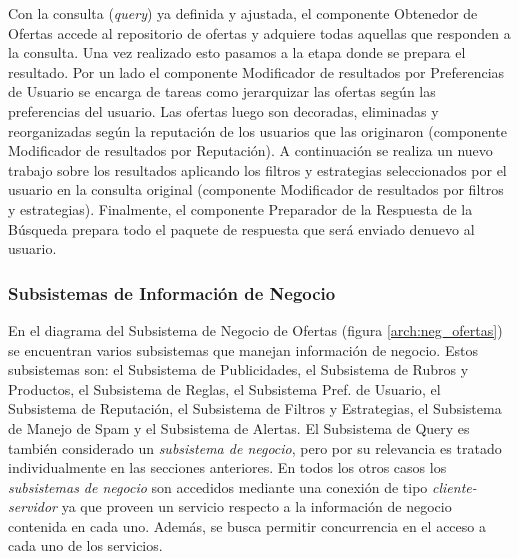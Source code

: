 Con la consulta (\emph{query}) ya definida y ajustada, el componente \textsf{Obtenedor de Ofertas} accede al repositorio de ofertas y adquiere todas aquellas que responden a la consulta.  Una vez realizado esto pasamos a la etapa donde se prepara el resultado. Por un lado el componente \textsf{Modificador de resultados por Preferencias de Usuario} se encarga de tareas como jerarquizar las ofertas según las preferencias del usuario. Las ofertas luego son decoradas, eliminadas y reorganizadas según la reputación de los usuarios que las originaron (componente \textsf{Modificador de resultados por Reputación}). A continuación se realiza un nuevo trabajo sobre los resultados aplicando los filtros y estrategias seleccionados por el usuario en la consulta original (componente \textsf{Modificador de resultados por filtros y estrategias}). Finalmente, el componente \textsf{Preparador de la Respuesta de la Búsqueda} prepara todo el paquete de respuesta que será enviado denuevo al usuario. 

\subsubsection{Subsistemas de Información de Negocio}

En el diagrama del \textsf{Subsistema de Negocio de Ofertas} (figura \ref{arch:neg_ofertas}) se encuentran varios subsistemas que manejan información de negocio. Estos subsistemas son: el \textsf{Subsistema de Publicidades}, el \textsf{Subsistema de Rubros y Productos}, el \textsf{Subsistema de Reglas}, el \textsf{Subsistema Pref. de Usuario}, el \textsf{Subsistema de Reputación}, el \textsf{Subsistema de Filtros y Estrategias}, el \textsf{Subsistema de Manejo de Spam} y el \textsf{Subsistema de Alertas}. El \textsf{Subsistema de Query} es también considerado un \emph{subsistema de negocio}, pero por su relevancia es tratado individualmente en las secciones anteriores.
En todos los otros casos los \emph{subsistemas de negocio} son accedidos mediante una conexión de tipo \emph{cliente-servidor} ya que proveen un servicio respecto a la información de negocio contenida en cada uno. Además, se busca permitir concurrencia en el acceso a cada uno de los servicios.

